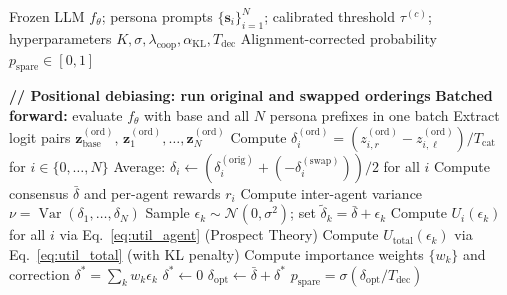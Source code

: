 \documentclass{article}
\begin{document}
\begin{algorithm}[t]
\caption{SWA-MPPI Inference for Scenario $\mathbf{x}$ in Country $c$}
\label{alg:swa}
\begin{algorithmic}[1]
\Require Frozen LLM $f_\theta$; persona prompts $\{\mathbf{s}_i\}_{i=1}^{N}$;
         calibrated threshold $\tau^{(c)}$; hyperparameters $K,\sigma,\lambda_{\text{coop}},\alpha_{\text{KL}},T_{\text{dec}}$
\Ensure Alignment-corrected probability $p_{\text{spare}} \in [0,1]$

\State \textbf{// Positional debiasing: run original and swapped orderings}
  \State \textbf{Batched forward:} evaluate $f_\theta$ with base and all $N$ persona prefixes in one batch
  \State Extract logit pairs $\mathbf{z}_{\text{base}}^{(\text{ord})},\,\mathbf{z}_1^{(\text{ord})},\ldots,\mathbf{z}_N^{(\text{ord})}$ \hfill{}
  \State Compute $\delta_i^{(\text{ord})} = (z_{i,r}^{(\text{ord})} - z_{i,\ell}^{(\text{ord})})/T_{\text{cat}}$ for $i \in \{0,\ldots,N\}$
\EndFor
\State Average: $\delta_i \leftarrow (\delta_i^{(\text{orig})} + (-\delta_i^{(\text{swap})}))/2$ for all $i$ \hfill{}
\State Compute consensus $\bar{\delta}$ and per-agent rewards $r_i$ \hfill{}
\State Compute inter-agent variance $\nu = \operatorname{Var}(\delta_1,\ldots,\delta_N)$
 \hfill{}
    \State Sample $\epsilon_k \sim \mathcal{N}(0, \sigma^2)$; set $\tilde{\delta}_k = \bar{\delta} + \epsilon_k$
    \State Compute $U_i(\epsilon_k)$ for all $i$ via Eq.~\ref{eq:util_agent} (Prospect Theory)
    \State Compute $U_{\text{total}}(\epsilon_k)$ via Eq.~\ref{eq:util_total} (with KL penalty)
  \EndFor
  \State Compute importance weights $\{w_k\}$ and correction $\delta^* = \sum_k w_k \epsilon_k$ \hfill{}
\Else
  \State $\delta^* \leftarrow 0$ \hfill{}
\EndIf
\State $\delta_{\text{opt}} \leftarrow \bar{\delta} + \delta^*$
\State \Return $p_{\text{spare}} = \sigma(\delta_{\text{opt}} / T_{\text{dec}})$ \hfill{}
\end{algorithmic}
\end{algorithm}
\end{document}
